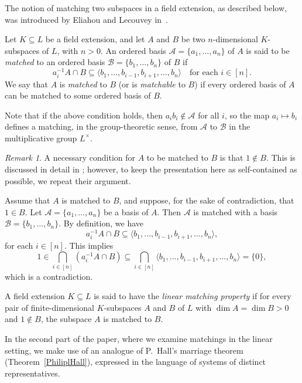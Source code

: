 \documentclass[11pt]{amsart}
\theoremstyle{definition}
\theoremstyle{remark}
\newtheorem{remark}[theorem]{Remark}
\begin{document}
The notion of matching two subspaces in a field extension, as described below, was introduced by Eliahou and Lecouvey in~\cite{Eliahou 2}.

Let \( K \subseteq L \) be a field extension, and let \( A \) and \( B \) be two \( n \)-dimensional \( K \)-subspaces of \( L \), with \( n > 0 \). An ordered basis \( \mathcal{A} = \{a_1, \ldots, a_n\} \) of \( A \) is said to be \emph{matched} to an ordered basis \( \mathcal{B} = \{b_1, \ldots, b_n\} \) of \( B \) if
\[
a_i^{-1} A \cap B \subseteq \langle b_1, \ldots, b_{i-1}, b_{i+1}, \ldots, b_n \rangle \quad \text{for each } i \in [n].
\]
We say that \( A \) is \emph{matched} to \( B \) (or is \emph{matchable} to \( B \)) if every ordered basis of \( A \) can be matched to some ordered basis of \( B \).

Note that if the above condition holds, then \( a_i b_i \notin \mathcal{A} \) for all \( i \), so the map \( a_i \mapsto b_i \) defines a matching, in the group-theoretic sense, from \( \mathcal{A} \) to \( \mathcal{B} \) in the multiplicative group \( L^\times \).


\begin{remark}\label{Necessary for Matching}
   A necessary condition for \( A \) to be matched to \( B \) is that \( 1 \notin B \). This is discussed in detail in \cite{Eliahou 2}; however, to keep the presentation here as self-contained as possible, we repeat their argument.
   
   Assume that \( A \) is matched to \( B \), and suppose, for the sake of contradiction, that \( 1 \in B \). Let \( \mathcal{A} = \{a_1, \dots, a_n\} \) be a basis of \( A \). Then \( \mathcal{A} \) is matched with a basis \( \mathcal{B} = \{b_1, \dots, b_n\} \). By definition, we have
\[
a_i^{-1}A \cap B \subseteq \langle b_1, \dots, b_{i-1}, b_{i+1}, \dots, b_n \rangle,
\]
for each \( i \in [n] \). This implies
\[
1 \in \bigcap_{i \in [n]} \left(a_i^{-1}A \cap B\right) \subseteq \bigcap_{i \in [n]} \langle b_1, \dots, b_{i-1}, b_{i+1}, \dots, b_n \rangle = \{0\},
\]
which is a contradiction.
\end{remark}


A field extension \( K \subseteq L \) is said to have the \emph{linear matching property} if for every pair of finite-dimensional \( K \)-subspaces \( A \) and \( B \) of \( L \) with \( \dim A = \dim B > 0 \) and \( 1 \notin B \), the subspace \( A \) is matched to \( B \).

\medskip

In the second part of the paper, where we examine matchings in the linear setting, we make use of an analogue of P.\ Hall's marriage theorem (Theorem~\ref{PhiliplHall}), expressed in the language of systems of distinct representatives.
\end{document}
